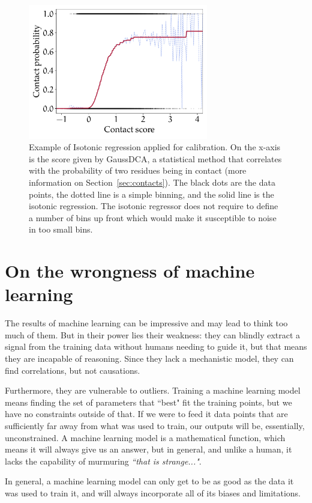 \begin{figure}[hbt]
	\centering
	\includegraphics[width=0.7\textwidth]{machine_learning/figures/isotonic}
	\caption{Example of Isotonic regression applied for calibration.
	On the x-axis is the score given by GaussDCA, a statistical method that correlates with the probability of two residues being in contact (more information on Section~\ref{sec:contacts}).
	The black dots are the data points, the dotted line is a simple binning, and the solid line is the isotonic regression.
	The isotonic regressor does not require to define a number of bins up front which would make it susceptible to noise in too small bins.}\label{fig:isotonic}
\end{figure}



\section{On the wrongness of machine learning}\label{sec:wrong}
The results of machine learning can be impressive and may lead to think too much of them.
But in their power lies their weakness: they can blindly extract a signal from the training data without humans needing to guide it, but that means they are incapable of reasoning.
Since they lack a mechanistic model, they can find correlations, but not causations.

Furthermore, they are vulnerable to outliers.
Training a machine learning model means finding the set of parameters that ``best" fit the training points, but we have no constraints outside of that.
If we were to feed it data points that are sufficiently far away from what was used to train, our outputs will be, essentially, unconstrained.
A machine learning model is a mathematical function, which means it will always give us an answer, but in general, and unlike a human, it lacks the capability of murmuring \emph{``that is strange..."}.

In general, a machine learning model can only get to be as good as the data it was used to train it, and will always incorporate all of its biases and limitations.


